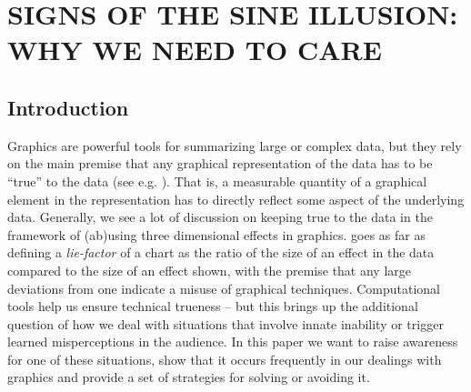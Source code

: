 \documentclass[11pt]{isuthesis}\usepackage[]{graphicx}\usepackage[]{color}
\begin{document}
\chapter{SIGNS OF THE SINE ILLUSION: WHY WE NEED TO CARE}\label{SineIllusionChapter}\label{sineillusion}

\section{Introduction}
Graphics are powerful tools for summarizing large or complex data, but they rely on the main premise that any graphical representation of the data has to be ``true'' to the data (see e.g. \citet{tufte, wainer:2000, robbins:2005}). That is, a measurable quantity of a graphical element in the representation has to  directly reflect some aspect of the underlying data. Generally, we see a lot of discussion on keeping true to the data in the framework of (ab)using three dimensional effects in graphics. \cite{tufte} goes as far as defining a {\it lie-factor} of a chart as the ratio of the size of an effect in the data compared to the size of an effect shown, with the premise that any large deviations from one indicate a misuse of graphical techniques. Computational tools help us ensure technical trueness -- but this brings up the additional question of how we deal with situations that involve innate inability or trigger learned misperceptions in the audience. In this paper we want to raise awareness for one of these situations, show that it occurs frequently in our dealings with graphics and provide a set of strategies for solving or avoiding it.
\end{document}
